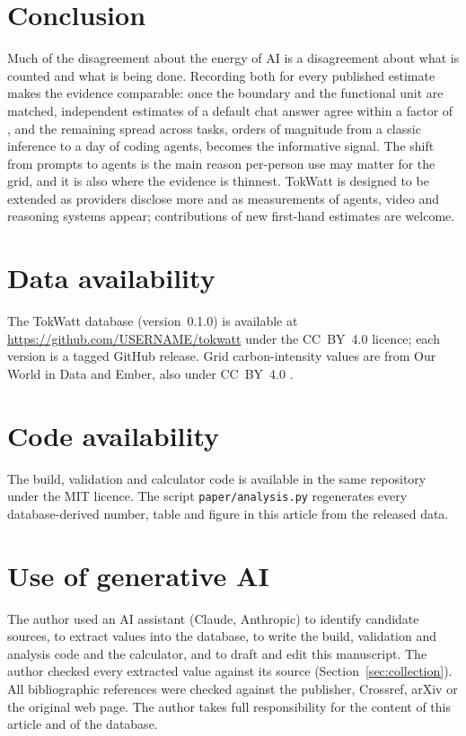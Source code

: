 \documentclass[11pt]{article}
\newcommand{\repoURL}{\url{https://github.com/USERNAME/tokwatt}}
\newcommand{\version}{0.1.0}
\newcommand{\file}[1]{\texttt{#1}}
\begin{document}
\section{Conclusion}
\label{sec:conclusion}

Much of the disagreement about the energy of AI is a disagreement about what is counted and what is being done. Recording both for every published estimate makes the evidence comparable: once the boundary and the functional unit are matched, independent estimates of a default chat answer agree within a factor of \clusterRatio, and the remaining spread across tasks, \oomWord{} orders of magnitude from a classic inference to a day of coding agents, becomes the informative signal. The shift from prompts to agents is the main reason per-person use may matter for the grid, and it is also where the evidence is thinnest. TokWatt is designed to be extended as providers disclose more and as measurements of agents, video and reasoning systems appear; contributions of new first-hand estimates are welcome.

\section*{Data availability}
The TokWatt database (version~\version) is available at \repoURL{} under the CC~BY~4.0 licence; each version is a tagged GitHub release. Grid carbon-intensity values are from Our World in Data and Ember, also under CC~BY~4.0 \citep{owid2026energy}.

\section*{Code availability}
The build, validation and calculator code is available in the same repository under the MIT licence. The script \file{paper/analysis.py} regenerates every database-derived number, table and figure in this article from the released data.

\section*{Use of generative AI}
The author used an AI assistant (Claude, Anthropic) to identify candidate sources, to extract values into the database, to write the build, validation and analysis code and the calculator, and to draft and edit this manuscript. The author checked every extracted value against its source (Section~\ref{sec:collection}). All bibliographic references were checked against the publisher, Crossref, arXiv or the original web page. The author takes full responsibility for the content of this article and of the database.
\end{document}
